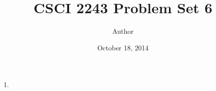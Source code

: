 \documentclass[12pt]{article}
\newenvironment{problem}[2][Problem]{\begin{trivlist}
\item[\hskip \labelsep {\bfseries #1}\hskip \labelsep {\bfseries #2.}]}{\end{trivlist}}
\begin{document}
\title{CSCI 2243 Problem Set 6}
\author{Author}
\date{October 18, 2014}
\maketitle
\begin{problem}{1}
\renewcommand{\labelenumi}{(\alph{enumi})}
\begin{enumerate}
\item
\end{enumerate}
\end{problem}
\end{document}
